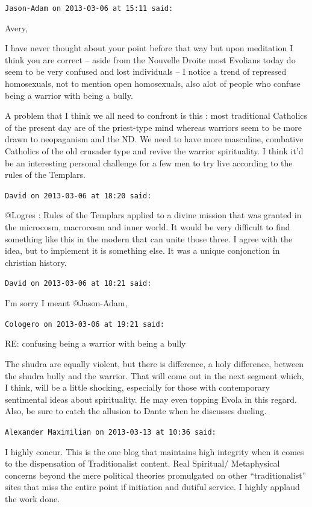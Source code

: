 \begin{footnotesize}
\begin{sffamily}
\hfill

\texttt{Jason-Adam on 2013-03-06 at 15:11 said:}

Avery,

I have never thought about your point before that way but upon meditation I think you are correct -- aside from the Nouvelle Droite most Evolians today do seem to be very confused and lost individuals -- I notice a trend of repressed homosexuals, not to mention open homosexuals, also alot of people who confuse being a warrior with being a bully.

A problem that I think we all need to confront is this : most traditional Catholics of the present day are of the priest-type mind whereas warriors seem to be more drawn to neopaganism and the ND. We need to have more masculine, combative Catholics of the old crusader type and revive the warrior spirituality. I think it'd be an interesting personal challenge for a few men to try live according to the rules of the Templars.

\hfill

\texttt{David on 2013-03-06 at 18:20 said:}

@Logres : Rules of the Templars applied to a divine mission that was granted in the microcosm, macrocosm and inner world. It would be very difficult to find something like this in the modern that can unite those three. I agree with the idea, but to implement it is something else. It was a unique conjonction in christian history.

\hfill

\texttt{David on 2013-03-06 at 18:21 said:}

I'm sorry I meant @Jason-Adam,

\hfill

\texttt{Cologero on 2013-03-06 at 19:21 said:}

RE: confusing being a warrior with being a bully

The shudra are equally violent, but there is difference, a holy difference, between the shudra bully and the warrior. That will come out in the next segment which, I think, will be a little shocking, especially for those with contemporary sentimental ideas about spirituality. He may even topping Evola in this regard. Also, be sure to catch the allusion to Dante when he discusses dueling.

\hfill

\texttt{Alexander Maximilian on 2013-03-13 at 10:36 said:}

I highly concur. This is the one blog that maintains high integrity when it comes to the dispensation of Traditionalist content. Real Spiritual/ Metaphysical concerns beyond the mere political theories promulgated on other ``traditionalist'' sites that miss the entire point if initiation and dutiful service. I highly applaud the work done.

\hfill

\end{sffamily}
\end{footnotesize}


